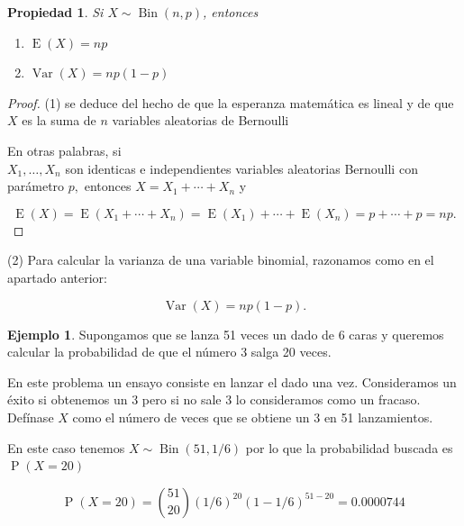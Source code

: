 \documentclass[]{book}
\theoremstyle{plain}
\newtheorem{property}[theorem]{Propiedad}
\theoremstyle{definition}
\newtheorem{example}[theorem]{Ejemplo}
\theoremstyle{definition} %
\begin{document}
\begin{property}
  
Si \(\displaystyle X\sim \operatorname {Bin} (n,p)\), entonces 
\begin{enumerate}[(1)]
  \item $\operatorname {E} (X)=np$
  \item $\operatorname {Var} (X)=np(1-p)$
\end{enumerate}
\end{property}


\begin{proof}
  
(1) se deduce del hecho de que la esperanza matemática es lineal y de
que \(X\) es la suma de \(n\) variables aleatorias de Bernoulli

En otras palabras, si\\
\(\displaystyle X_{1},\ldots ,X_{n}\) son identicas e independientes
variables aleatorias Bernoulli con parámetro \(p,\) entonces
\(\displaystyle X=X_{1}+\cdots +X_{n}\) y

\[\displaystyle \operatorname {E} (X)=\operatorname {E} (X_{1}+\cdots +X_{n})=\operatorname {E} (X_{1})+\cdots +\operatorname {E} (X_{n})=p+\cdots +p=np.\]

\end{proof}
 
(2) Para calcular la varianza de una variable binomial, razonamos como en el
apartado anterior:

\[\displaystyle \operatorname {Var} (X)=np(1-p).\]
 



\begin{example}
  
Supongamos que se lanza 51 veces un dado de 6 caras y queremos calcular
la probabilidad de que el número 3 salga 20 veces.

En este problema un ensayo consiste en lanzar el dado una vez.
Consideramos un éxito si obtenemos un 3 pero si no sale 3 lo
consideramos como un fracaso. Defínase \(X\) como el número de veces que
se obtiene un 3 en 51 lanzamientos.

En este caso tenemos
\(\displaystyle X\sim \operatorname {Bin} (51,1/6)\) por lo que la
probabilidad buscada es \(\displaystyle \operatorname {P} (X=20)\)

\[\displaystyle \operatorname {P} (X=20)={51 \choose 20}(1/6)^{20}(1-1/6)^{51-20}=0.0000744\,\!\]

\end{example}
 
\end{document}
